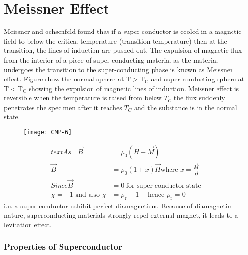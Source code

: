 \section{Meissner Effect}
Meissner and ochsenfeld found that if a super conductor is cooled in a magnetic field to below the critical temperature (transition temperature) then at the transition, the lines of induction are pushed out. The expulsion of magnetic flux from the interior of a piece of super-conducting material as the material undergoes the transition to the super-conducting phase is known as Meissner effect. Figure show the normal sphere at $\mathrm{T}>\mathrm{T}_{\mathrm{C}}$ and super conducting sphere at $\mathrm{T}<\mathrm{T}_{\mathrm{C}}$ showing the expulsion of magnetic lines of induction. Meissner effect is reversible when the temperature is raised from below $T_{C}$ the flux suddenly penetrates the specimen after it reaches $T_{C}$ and the substance is in the normal state.
\begin{figure}[H]
	\centering
	\texttt{[image: CMP-6]}
	\caption{}
	\label{}
\end{figure}
\begin{align*}
text{As }\quad 
\vec{B}&=\mu_{0}(\vec{H}+\vec{M})\\
\vec{B}&=\mu_{0}(1+x) \vec{H}
\text{where }x=\frac{\vec{M}}{\vec{H}}\\
Since
\vec{B}&=0\text{ for super conductor state}\\
\chi=-1 \text { and also } \chi&=\mu_{\mathrm{r}}-1\quad \text { hence } \mu_{\mathrm{r}}=0
\end{align*}
i.e. a super conductor exhibit perfect diamagnetism. Because of diamagnetic nature, superconducting materials strongly repel external magnet, it leads to a levitation effect.
\subsubsection{Properties of Superconductor}
